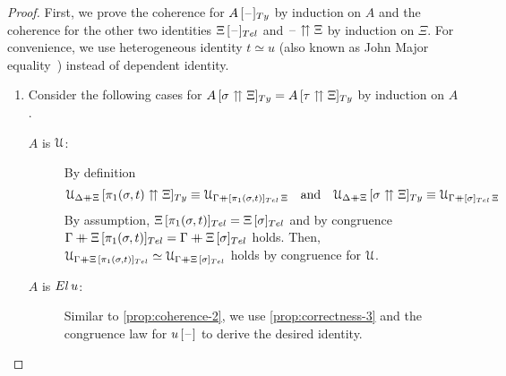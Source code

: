 \documentclass[a4paper,UKenglish,numberwithinsect,cleveref,thm-restate]{lipics-v2021}
\begin{document}
\begin{proof}
  First, we prove the coherence for $\subTy{A}{\blank}$ by induction on $A$ and the coherence for the other two identities $\subTel{\Xi}{\blank}$ and $\mathord{\hspace{1pt}\text{--}\hspace{1pt}} \upuparrows \Xi$ by induction on $\Xi$.
  For convenience, we use heterogeneous identity $t \simeq u$ (also known as John Major equality~\cite{McBride1999}) instead of dependent identity.
  \begin{enumerate}
    \item Consider the following cases for $\subTy{A}{\sigma\upuparrows\Xi} = \subTy{A}{\tau \upuparrows \Xi}$ by induction on $A$.
      \begin{description}
        \item[$A$ is $\mathcal{U}$:] By definition
          \[
            \subTy{\UU_{\Delta\dplus \Xi}}{\pi_1(\sigma, t) \upuparrows \Xi} \judgeq \UU_{\Gamma \dplus [\pi_1(\sigma, t)]_{\Tel}\,\Xi} \quad\text{and}\quad \subTy{\UU_{\Delta\dplus \Xi}}{\sigma\upuparrows \Xi} \judgeq \UU_{\Gamma \dplus [\sigma]_{\Tel}\,\Xi}
          \]
          By assumption, $\subTel{\Xi}{\pi_1(\sigma, t)} = \subTel{\Xi}{\sigma}$ and by congruence $\Gamma \dplus \subTel{\Xi}{\pi_1(\sigma, t)} = \Gamma \dplus \subTel{\Xi}{\sigma}$ holds.
          Then, $\UU_{\Gamma \dplus \subTel{\Xi}{\pi_1(\sigma, t)}} \simeq \UU_{\Gamma \dplus \subTel{\Xi}{\sigma}}$ holds by congruence for $\mathcal{U}$.

        \item[$A$ is $\El\,u$:]
          Similar to \cref{prop:coherence-2}, we use \cref{prop:correctness-3} and the congruence law for ${u}\,[\mathord{\hspace{1pt}\text{--}\hspace{1pt}}]$ to derive the desired identity.


\end{description}
\end{enumerate}
\end{proof}
\end{document}
